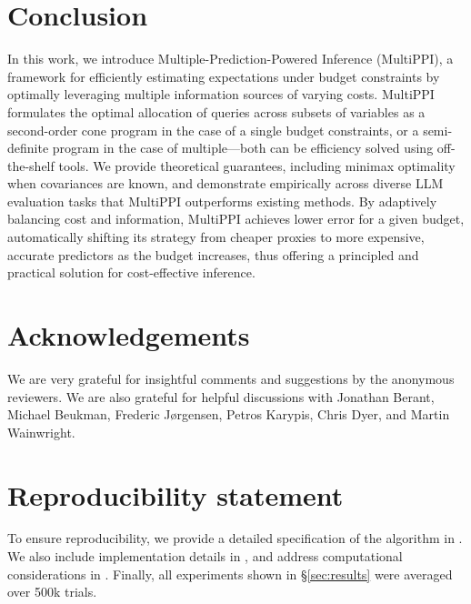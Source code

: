 \documentclass{article} %
\newcommand{\charlie}[1]{ {\color{red}[CCB: #1]}}
\newtheorem{theorem}{Theorem}
\begin{document}


\section{Conclusion}
In this work, we introduce Multiple-Prediction-Powered Inference (MultiPPI), a framework for efficiently estimating expectations under budget constraints by optimally leveraging multiple information sources of varying costs. MultiPPI formulates the optimal allocation of queries across subsets of variables as a second-order cone program in the case of a single budget constraints, or a semi-definite program in the case of multiple---both can be efficiency solved using off-the-shelf tools. We provide theoretical guarantees, including minimax optimality when covariances are known, and demonstrate empirically across diverse LLM evaluation tasks that MultiPPI outperforms existing methods. By adaptively balancing cost and information, MultiPPI achieves lower error for a given budget, automatically shifting its strategy from cheaper proxies to more expensive, accurate predictors as the budget increases, thus offering a principled and practical solution for cost-effective inference.
\newpage

\section*{Acknowledgements}
We are very grateful for insightful comments and suggestions by the anonymous reviewers. We are also grateful for helpful discussions with Jonathan Berant, Michael Beukman, Frederic J\o rgensen, Petros Karypis, Chris Dyer, and Martin Wainwright.

\section*{Reproducibility statement}
To ensure reproducibility, we provide a detailed specification of the algorithm in . We also include implementation details in , and address computational considerations in . Finally, all experiments shown in \S\ref{sec:results} were averaged over 500k trials.
\end{document}

